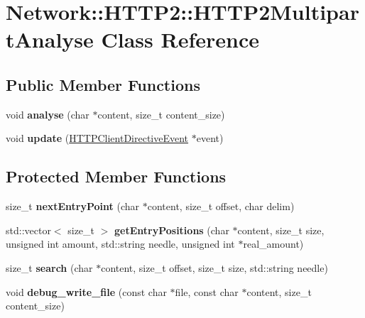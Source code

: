 \hypertarget{classNetwork_1_1HTTP2_1_1HTTP2MultipartAnalyse}{}\section{Network\+:\+:H\+T\+T\+P2\+:\+:H\+T\+T\+P2\+Multipart\+Analyse Class Reference}
\label{classNetwork_1_1HTTP2_1_1HTTP2MultipartAnalyse}
\subsection*{Public Member Functions}
\begin{DoxyCompactItemize}
\item 
\mbox{\label{classNetwork_1_1HTTP2_1_1HTTP2MultipartAnalyse_a8095baf78ba7751fa825ed3c7af7cdab}} 
void {\bfseries analyse} (char $\ast$content, size\+\_\+t content\+\_\+size)
\item 
\mbox{\label{classNetwork_1_1HTTP2_1_1HTTP2MultipartAnalyse_a726ea0b002f20515e3088e9f75b5b97a}} 
void {\bfseries update} (\hyperlink{classNetwork_1_1HTTP_1_1HTTPClientDirectiveEvent}{H\+T\+T\+P\+Client\+Directive\+Event} $\ast$event)
\end{DoxyCompactItemize}
\subsection*{Protected Member Functions}
\begin{DoxyCompactItemize}
\item 
\mbox{\label{classNetwork_1_1HTTP2_1_1HTTP2MultipartAnalyse_a68e226bc76e8107d253cf4c5c7e8629a}} 
size\+\_\+t {\bfseries next\+Entry\+Point} (char $\ast$content, size\+\_\+t offset, char delim)
\item 
\mbox{\label{classNetwork_1_1HTTP2_1_1HTTP2MultipartAnalyse_a6f3139365b1a13706db5394392d1a3e4}} 
std\+::vector$<$ size\+\_\+t $>$ {\bfseries get\+Entry\+Positions} (char $\ast$content, size\+\_\+t size, unsigned int amount, std\+::string needle, unsigned int $\ast$real\+\_\+amount)
\item 
\mbox{\label{classNetwork_1_1HTTP2_1_1HTTP2MultipartAnalyse_aa8869c2b1e4cf58188ce570f08c4543a}} 
size\+\_\+t {\bfseries search} (char $\ast$content, size\+\_\+t offset, size\+\_\+t size, std\+::string needle)
\item 
\mbox{\label{classNetwork_1_1HTTP2_1_1HTTP2MultipartAnalyse_a855bf74fd45edae96ed2a17f6a7dfaef}} 
void {\bfseries debug\+\_\+write\+\_\+file} (const char $\ast$file, const char $\ast$content, size\+\_\+t content\+\_\+size)
\end{DoxyCompactItemize}


